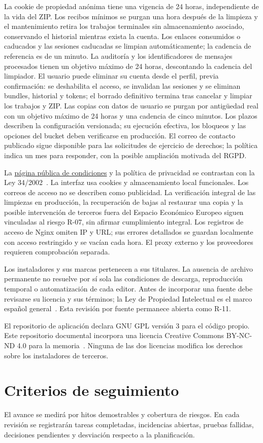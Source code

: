 La cookie de propiedad anónima tiene una vigencia de 24 horas, independiente de la vida del ZIP. Los recibos mínimos se purgan una hora después de la limpieza y el mantenimiento retira los trabajos terminales sin almacenamiento asociado, conservando el historial mientras exista la cuenta. Los enlaces consumidos o caducados y las sesiones caducadas se limpian automáticamente; la cadencia de referencia es de un minuto. La auditoría y los identificadores de mensajes procesados tienen un objetivo máximo de 24 horas, descontando la cadencia del limpiador. El usuario puede eliminar su cuenta desde el perfil, previa confirmación: se deshabilita el acceso, se invalidan las sesiones y se eliminan bundles, historial y tokens; el borrado definitivo termina tras cancelar y limpiar los trabajos y ZIP. Las copias con datos de usuario se purgan por antigüedad real con un objetivo máximo de 24 horas y una cadencia de cinco minutos. Los plazos describen la configuración versionada; su ejecución efectiva, los bloqueos y las opciones del bucket deben verificarse en producción. El correo de contacto publicado sigue disponible para las solicitudes de ejercicio de derechos; la política indica un mes para responder, con la posible ampliación motivada del RGPD.

La \href{https://batchdownloader.dev/terms}{página pública de condiciones} y la política de privacidad se contrastan con la Ley 34/2002~\cite{lssi}. La interfaz usa cookies y almacenamiento local funcionales. Los correos de acceso no se describen como publicidad. La verificación integral de las limpiezas en producción, la recuperación de bajas al restaurar una copia y la posible intervención de terceros fuera del Espacio Económico Europeo siguen vinculadas al riesgo R-07, sin afirmar cumplimiento integral. Los registros de acceso de Nginx omiten IP y URL; sus errores detallados se guardan localmente con acceso restringido y se vacían cada hora. El proxy externo y los proveedores requieren comprobación separada.

Los instaladores y sus marcas pertenecen a sus titulares. La ausencia de archivo permanente no resuelve por sí sola las condiciones de descarga, reproducción temporal o automatización de cada editor. Antes de incorporar una fuente debe revisarse su licencia y sus términos; la Ley de Propiedad Intelectual es el marco español general~\cite{propiedadIntelectual}. Esta revisión por fuente permanece abierta como R-11.

El repositorio de aplicación declara GNU GPL versión 3 para el código propio. Este repositorio documental incorpora una licencia Creative Commons BY-NC-ND 4.0 para la memoria~\cite{cc-by-nc-nd}. Ninguna de las dos licencias modifica los derechos sobre los instaladores de terceros.

\section{Criterios de seguimiento}

El avance se medirá por hitos demostrables y cobertura de riesgos. En cada revisión se registrarán tareas completadas, incidencias abiertas, pruebas fallidas, decisiones pendientes y desviación respecto a la planificación.
